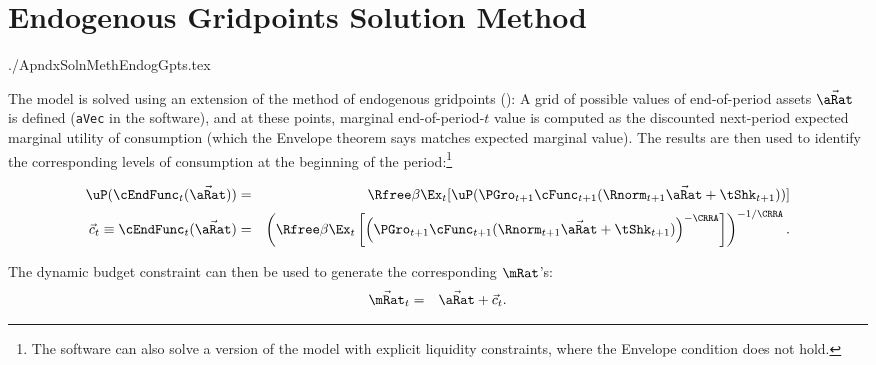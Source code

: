 \documentclass{econtex}
\begin{document}
\large

\section{Endogenous Gridpoints Solution Method}
\begin{verbatimwrite}{./ApndxSolnMethEndogGpts.tex}


  The model is solved using an extension of the method of endogenous
  gridpoints (\cite{carroll:endogenous}): A grid of possible values of
  end-of-period assets $\vec{\aRat}$ is defined (\texttt{aVec} in the
  software), and at these points, marginal end-of-period-$t$ value is
  computed as the discounted next-period expected marginal utility of
  consumption (which the Envelope theorem says matches expected
  marginal value).  The results are then used to identify the
  corresponding levels of consumption at the beginning of the period:\footnote{The software can also
solve a version of the model with explicit liquidity constraints, where the Envelope condition does not hold.}

\begin{eqnarray}
  \uP(\cEndFunc_{t}(\vec{\aRat})) & = & \Rfree \beta \Ex_{t}[ \uP(\PGro_{t+1}
  \cFunc_{t+1}(\Rnorm_{t+1}\vec{\aRat} + \tShk_{t+1}))] \label{eq:cEulerEndog}
\\ \vec{c}_{t} \equiv \cEndFunc_{t}(\vec{\aRat}) & = & \left(\Rfree \beta \Ex_{t}\left[ \left(\PGro_{t+1}
      \cFunc_{t+1}(\Rnorm_{t+1}\vec{\aRat} +
      \tShk_{t+1})\right)^{-\CRRA}\right]\right)^{-1/\CRRA}. \notag
\end{eqnarray}

The dynamic budget constraint can then be used to generate the corresponding $\mRat$'s:
\begin{eqnarray*}
  \vec{\mRat}_{t} & = & \vec{\aRat}+\vec{c}_{t}.
\end{eqnarray*}


\end{verbatimwrite}
\end{document}
